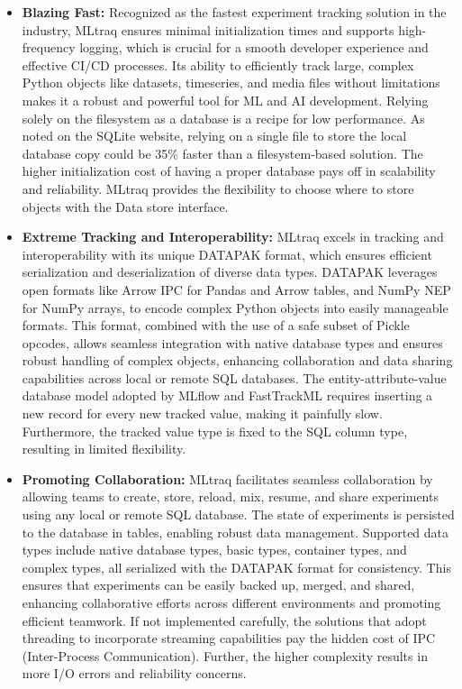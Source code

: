 \begin{itemize}
    \item \textbf{Blazing Fast:} Recognized as the fastest experiment tracking solution in the industry, MLtraq ensures minimal initialization times and supports high-frequency logging, which is crucial for a smooth developer experience and effective CI/CD processes. Its ability to efficiently track large, complex Python objects like datasets, timeseries, and media files without limitations makes it a robust and powerful tool for ML and AI development. Relying solely on the filesystem as a database is a recipe for low performance. As noted on the SQLite website, relying on a single file to store the local database copy could be 35\% faster than a filesystem-based solution. The higher initialization cost of having a proper database pays off in scalability and reliability. MLtraq provides the flexibility to choose where to store objects with the Data store interface.
    \item \textbf{Extreme Tracking and Interoperability:} MLtraq excels in tracking and interoperability with its unique DATAPAK format, which ensures efficient serialization and deserialization of diverse data types. DATAPAK leverages open formats like Arrow IPC for Pandas and Arrow tables, and NumPy NEP for NumPy arrays, to encode complex Python objects into easily manageable formats. This format, combined with the use of a safe subset of Pickle opcodes, allows seamless integration with native database types and ensures robust handling of complex objects, enhancing collaboration and data sharing capabilities across local or remote SQL databases. The entity-attribute-value database model adopted by MLflow and FastTrackML requires inserting a new record for every new tracked value, making it painfully slow. Furthermore, the tracked value type is fixed to the SQL column type, resulting in limited flexibility.
    \item \textbf{Promoting Collaboration:} MLtraq facilitates seamless collaboration by allowing teams to create, store, reload, mix, resume, and share experiments using any local or remote SQL database. The state of experiments is persisted to the database in tables, enabling robust data management. Supported data types include native database types, basic types, container types, and complex types, all serialized with the DATAPAK format for consistency. This ensures that experiments can be easily backed up, merged, and shared, enhancing collaborative efforts across different environments and promoting efficient teamwork. If not implemented carefully, the solutions that adopt threading to incorporate streaming capabilities pay the hidden cost of IPC (Inter-Process Communication). Further, the higher complexity results in more I/O errors and reliability concerns.

\end{itemize}
